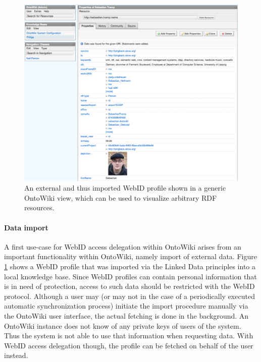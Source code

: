 \documentclass[a4paper]{llncs}
\begin{document}
\begin{figure}[htb]
  \centering
  \includegraphics[width=\textwidth]{ontowiki}
  \caption{An external and thus imported WebID profile shown in a generic OntoWiki view, which can be used to visualize arbitrary RDF resources.}
  \label{fig:ontowiki}
\end{figure}

\paragraph{Data import}
A first use-case for WebID access delegation within OntoWiki arises from an important functionality within OntoWiki, namely import of external data.
Figure \ref{fig:ontowiki} shows a WebID profile that was imported via the Linked Data principles into a local knowledge base.
Since WebID profiles can contain personal information that is in need of protection, access to such data should be restricted with the WebID protocol.
Although a user may (or may not in the case of a periodically executed automatic synchronization process) initiate the import procedure manually via the OntoWiki user interface, the actual fetching is done in the background.
An OntoWiki instance does not know of any private keys of users of the system.
Thus the system is not able to use that information when requesting data.
With WebID access delegation though, the profile can be fetched on behalf of the user instead.
\end{document}

